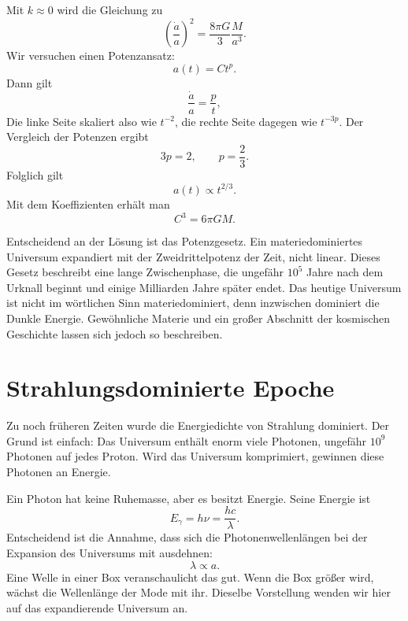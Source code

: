 Mit \(k\approx 0\) wird die Gleichung zu
\begin{equation}
\left(\frac{\dot a}{a}\right)^2=\frac{8\pi G}{3}\frac{M}{a^3}.
\end{equation}
Wir versuchen einen Potenzansatz:
\begin{equation}
a(t)=Ct^p.
\end{equation}
Dann gilt
\begin{equation}
\frac{\dot a}{a}=\frac{p}{t},
\end{equation}
Die linke Seite skaliert also wie \(t^{-2}\), die rechte Seite dagegen wie \(t^{-3p}\). Der Vergleich der Potenzen ergibt
\begin{equation}
3p=2,
\qquad
p=\frac{2}{3}.
\end{equation}
Folglich gilt
\begin{equation}
a(t)\propto t^{2/3}.
\end{equation}
Mit dem Koeffizienten erhält man
\begin{equation}
C^3=6\pi G M.
\end{equation}

Entscheidend an der Lösung ist das Potenzgesetz. Ein materiedominiertes Universum expandiert mit der Zweidrittelpotenz der Zeit, nicht linear. Dieses Gesetz beschreibt eine lange Zwischenphase, die ungefähr \(10^5\) Jahre nach dem Urknall beginnt und einige Milliarden Jahre später endet. Das heutige Universum ist nicht im wörtlichen Sinn materiedominiert, denn inzwischen dominiert die Dunkle Energie. Gewöhnliche Materie und ein großer Abschnitt der kosmischen Geschichte lassen sich jedoch so beschreiben.

\section{Strahlungsdominierte Epoche}

Zu noch früheren Zeiten wurde die Energiedichte von Strahlung dominiert. Der Grund ist einfach: Das Universum enthält enorm viele Photonen, ungefähr \(10^9\) Photonen auf jedes Proton. Wird das Universum komprimiert, gewinnen diese Photonen an Energie.

Ein Photon hat keine Ruhemasse, aber es besitzt Energie. Seine Energie ist
\begin{equation}
E_\gamma=h\nu=\frac{hc}{\lambda}.
\end{equation}
Entscheidend ist die Annahme, dass sich die Photonenwellenlängen bei der Expansion des Universums mit ausdehnen:
\begin{equation}
\lambda\propto a.
\end{equation}
Eine Welle in einer Box veranschaulicht das gut. Wenn die Box größer wird, wächst die Wellenlänge der Mode mit ihr. Dieselbe Vorstellung wenden wir hier auf das expandierende Universum an.

